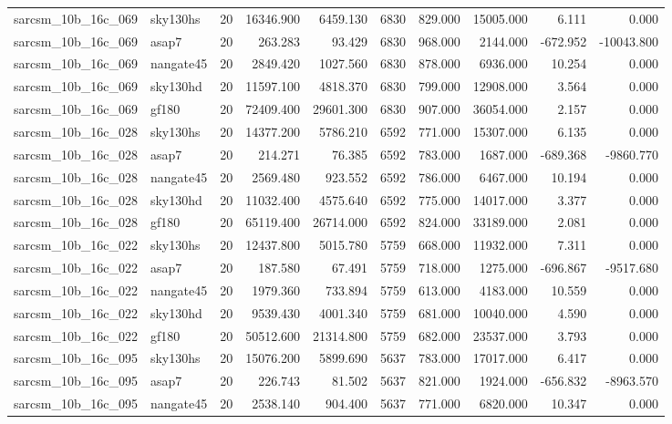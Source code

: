\documentclass{article}
\begin{document}
\begin{longtable}{llrrrrrrrr}
sarcsm\_10b\_16c\_069 & sky130hs & 20 & 16346.900 & 6459.130 & 6830 & 829.000 & 15005.000 & 6.111 & 0.000 \\
sarcsm\_10b\_16c\_069 & asap7 & 20 & 263.283 & 93.429 & 6830 & 968.000 & 2144.000 & -672.952 & -10043.800 \\
sarcsm\_10b\_16c\_069 & nangate45 & 20 & 2849.420 & 1027.560 & 6830 & 878.000 & 6936.000 & 10.254 & 0.000 \\
sarcsm\_10b\_16c\_069 & sky130hd & 20 & 11597.100 & 4818.370 & 6830 & 799.000 & 12908.000 & 3.564 & 0.000 \\
sarcsm\_10b\_16c\_069 & gf180 & 20 & 72409.400 & 29601.300 & 6830 & 907.000 & 36054.000 & 2.157 & 0.000 \\
sarcsm\_10b\_16c\_028 & sky130hs & 20 & 14377.200 & 5786.210 & 6592 & 771.000 & 15307.000 & 6.135 & 0.000 \\
sarcsm\_10b\_16c\_028 & asap7 & 20 & 214.271 & 76.385 & 6592 & 783.000 & 1687.000 & -689.368 & -9860.770 \\
sarcsm\_10b\_16c\_028 & nangate45 & 20 & 2569.480 & 923.552 & 6592 & 786.000 & 6467.000 & 10.194 & 0.000 \\
sarcsm\_10b\_16c\_028 & sky130hd & 20 & 11032.400 & 4575.640 & 6592 & 775.000 & 14017.000 & 3.377 & 0.000 \\
sarcsm\_10b\_16c\_028 & gf180 & 20 & 65119.400 & 26714.000 & 6592 & 824.000 & 33189.000 & 2.081 & 0.000 \\
sarcsm\_10b\_16c\_022 & sky130hs & 20 & 12437.800 & 5015.780 & 5759 & 668.000 & 11932.000 & 7.311 & 0.000 \\
sarcsm\_10b\_16c\_022 & asap7 & 20 & 187.580 & 67.491 & 5759 & 718.000 & 1275.000 & -696.867 & -9517.680 \\
sarcsm\_10b\_16c\_022 & nangate45 & 20 & 1979.360 & 733.894 & 5759 & 613.000 & 4183.000 & 10.559 & 0.000 \\
sarcsm\_10b\_16c\_022 & sky130hd & 20 & 9539.430 & 4001.340 & 5759 & 681.000 & 10040.000 & 4.590 & 0.000 \\
sarcsm\_10b\_16c\_022 & gf180 & 20 & 50512.600 & 21314.800 & 5759 & 682.000 & 23537.000 & 3.793 & 0.000 \\
sarcsm\_10b\_16c\_095 & sky130hs & 20 & 15076.200 & 5899.690 & 5637 & 783.000 & 17017.000 & 6.417 & 0.000 \\
sarcsm\_10b\_16c\_095 & asap7 & 20 & 226.743 & 81.502 & 5637 & 821.000 & 1924.000 & -656.832 & -8963.570 \\
sarcsm\_10b\_16c\_095 & nangate45 & 20 & 2538.140 & 904.400 & 5637 & 771.000 & 6820.000 & 10.347 & 0.000 \\

\end{longtable}
\end{document}
